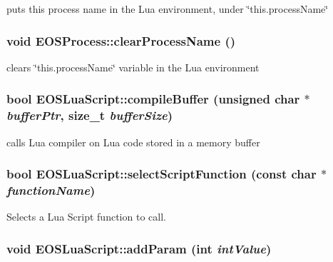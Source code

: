 puts this process name in the Lua environment, under \char`\"{}this.processName\char`\"{} 

\hypertarget{classEOSProcess_9beab4f3d93c870ce78905dff204ed14}{
\subsubsection[{clearProcessName}]{\setlength{\rightskip}{0pt plus 5cm}void EOSProcess::clearProcessName ()}}
\label{classEOSProcess_9beab4f3d93c870ce78905dff204ed14}


clears \char`\"{}this.processName\char`\"{} variable in the Lua environment 

\hypertarget{classEOSLuaScript_c1d576d2d3ffa64a9437a062f325a813}{
\subsubsection[{compileBuffer}]{\setlength{\rightskip}{0pt plus 5cm}bool EOSLuaScript::compileBuffer (unsigned char $\ast$ {\em bufferPtr}, \/  size\_\-t {\em bufferSize})}}
\label{classEOSLuaScript_c1d576d2d3ffa64a9437a062f325a813}


calls Lua compiler on Lua code stored in a memory buffer 

\hypertarget{classEOSLuaScript_7f00ff555be32da27000d51bc7ba420f}{
\subsubsection[{selectScriptFunction}]{\setlength{\rightskip}{0pt plus 5cm}bool EOSLuaScript::selectScriptFunction (const char $\ast$ {\em functionName})}}
\label{classEOSLuaScript_7f00ff555be32da27000d51bc7ba420f}


Selects a Lua Script function to call. 

\hypertarget{classEOSLuaScript_a939a1d1daa1326a012e5e60e1b45f95}{
\subsubsection[{addParam}]{\setlength{\rightskip}{0pt plus 5cm}void EOSLuaScript::addParam (int {\em intValue})}}
\label{classEOSLuaScript_a939a1d1daa1326a012e5e60e1b45f95}


